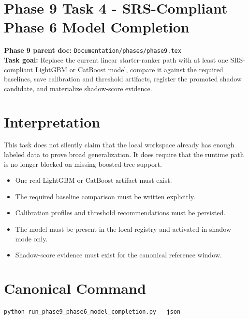 \documentclass{article}
\begin{document}
\section*{Phase 9 Task 4 - SRS-Compliant Phase 6 Model Completion}

\textbf{Phase 9 parent doc:} \texttt{Documentation/phases/phase9.tex}\\
\textbf{Task goal:} Replace the current linear starter-ranker path with at least one SRS-compliant LightGBM or CatBoost model, compare it against the required baselines, save calibration and threshold artifacts, register the promoted shadow candidate, and materialize shadow-score evidence.

\section*{Interpretation}
This task does not silently claim that the local workspace already has enough labeled data to prove broad generalization. It does require that the runtime path is no longer blocked on missing boosted-tree support.
\begin{itemize}
\item One real LightGBM or CatBoost artifact must exist.
\item The required baseline comparison must be written explicitly.
\item Calibration profiles and threshold recommendations must be persisted.
\item The model must be present in the local registry and activated in shadow mode only.
\item Shadow-score evidence must exist for the canonical reference window.
\end{itemize}

\section*{Canonical Command}
\begin{verbatim}
python run_phase9_phase6_model_completion.py --json
\end{verbatim}
\end{document}
